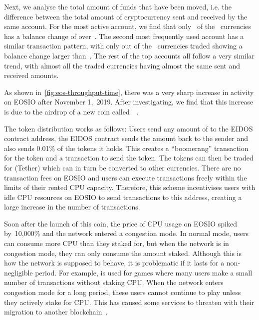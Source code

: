 Next, we analyse the total amount of funds that have been moved, i.e. the difference between the total amount of cryptocurrency sent and received by the same account.
For the most active account, we find that only~ of the~ currencies has a balance change of over~. 
The second most frequently used account has a similar transaction pattern, with only  out of the~ currencies traded showing a balance change larger than~.
The rest of the top accounts all follow a very similar trend, with almost all the traded currencies having almost the same sent and received amounts.


As shown in~\autoref{fig:eos-throughput-time}, there was a very sharp increase in activity on EOSIO after November 1,~2019. After investigating, we find that this increase is due to the airdrop of a new coin called~~\cite{Enumivo2019}.

The token distribution works as follows: Users send any amount of  to the EIDOS contract address, the EIDOS contract sends the  amount back to the sender and also sends 0.01\% of the  tokens it holds. This creates a ``boomerang'' transaction for the  token and a transaction to send the  token. The tokens can then be traded for  (Tether) which can in turn be converted to other currencies. There are no transaction fees on EOSIO and users can execute transactions freely within the limits of their rented CPU capacity. Therefore, this scheme incentivises users with idle CPU resources on EOSIO to send transactions to this address, creating a large increase in the number of transactions.

Soon after the launch of this coin, the price of CPU usage on EOSIO spiked by~10,000\% and the network entered a congestion mode.
In normal mode, users can consume more CPU than they staked for, but when the network is in congestion mode, they can only consume the amount staked. Although this is how the network is supposed to behave, it is problematic if it lasts for a non-negligible period. For example,  is used for games where many users make a small number of transactions without staking CPU. When the network enters congestion mode for a long period, these users cannot continue to play unless they actively stake  for CPU. 
This has caused some services to threaten with their migration to another blockchain~\cite{EarnBet2019EOSNotice}.

